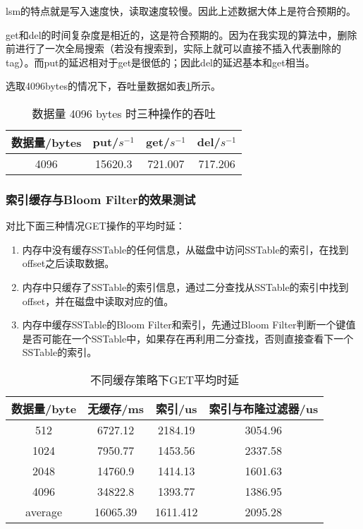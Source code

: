 \documentclass[fontset=windows]{article}
\begin{document}
lsm的特点就是写入速度快，读取速度较慢。因此上述数据大体上是符合预期的。

get和del的时间复杂度是相近的，这是符合预期的。因为在我实现的算法中，删除前进行了一次全局搜索（若没有搜索到，实际上就可以直接不插入代表删除的tag）。而put的延迟相对于get是很低的；因此del的延迟基本和get相当。

选取4096bytes的情况下，吞吐量数据如表\ref{table2}所示。

\begin{table}[h!]
    \begin{center}
      \caption{数据量 4096 bytes 时三种操作的吞吐}
      \label{table2}
      \begin{tabular}{c|c|c|c}
        \textbf{数据量/bytes} & \textbf{put/$s^{-1}$} & \textbf{get/$s^{-1}$} & \textbf{del/$s^{-1}$}\\
        \hline
        4096 & 15620.3 & 721.007 & 717.206 \\ 
      \end{tabular}
    \end{center}
\end{table}


\subsubsection{索引缓存与Bloom Filter的效果测试}
对比下面三种情况GET操作的平均时延：
\begin{enumerate}
    \item 内存中没有缓存SSTable的任何信息，从磁盘中访问SSTable的索引，在找到offset之后读取数据。
    \item 内存中只缓存了SSTable的索引信息，通过二分查找从SSTable的索引中找到offset，并在磁盘中读取对应的值。
    \item 内存中缓存SSTable的Bloom Filter和索引，先通过Bloom Filter判断一个键值是否可能在一个SSTable中，如果存在再利用二分查找，否则直接查看下一个SSTable的索引。
\end{enumerate}

\begin{table}[h!]
    \begin{center}
      \caption{不同缓存策略下GET平均时延}
      \label{table3}
      \begin{tabular}{c|c|c|c}
        \textbf{数据量/byte} & \textbf{无缓存/ms} & \textbf{索引/us} & \textbf{索引与布隆过滤器/us}\\
        \hline
        512 & 6727.12 & 2184.19 & 3054.96 \\
        1024 & 7950.77 & 1453.56 & 2337.58 \\
        2048 & 14760.9 & 1414.13 & 1601.63 \\
        4096 & 34822.8 & 1393.77 & 1386.95 \\
        \hline
        average & 16065.39 & 1611.412 & 2095.28 \\ 
      \end{tabular}
    \end{center}
\end{table}
\end{document}
